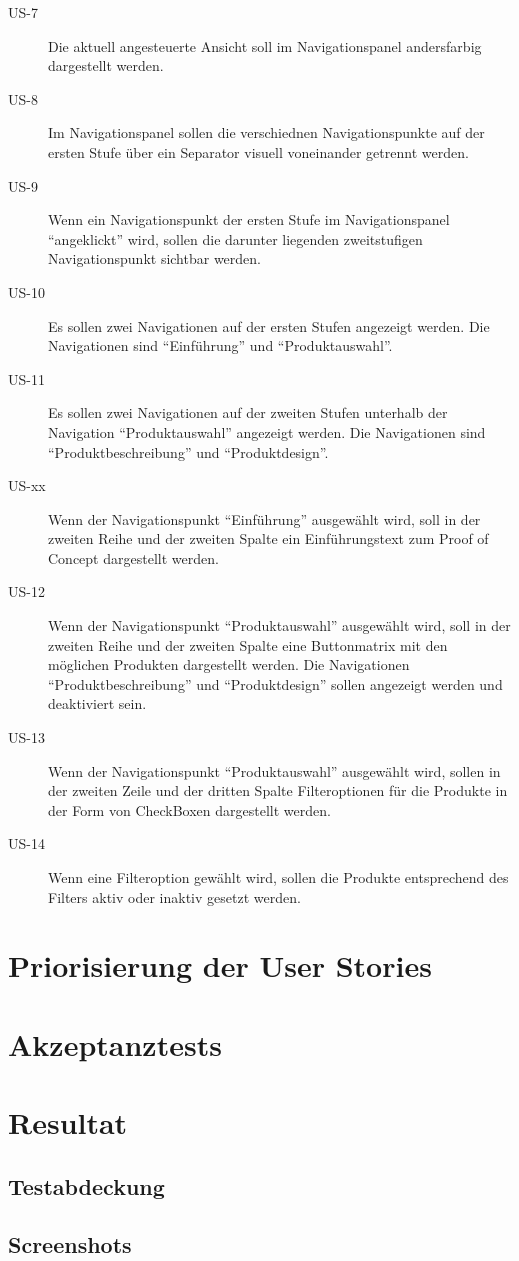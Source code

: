 \begin{description}
\item[US-7\label{itm:US-7}]
Die aktuell angesteuerte Ansicht soll im Navigationspanel andersfarbig
dargestellt werden.

\item[US-8\label{itm:US-8}]
Im Navigationspanel sollen die verschiednen Navigationspunkte auf der ersten
Stufe über ein Separator visuell voneinander getrennt werden.

\item[US-9\label{itm:US-9}]
Wenn ein Navigationspunkt der ersten Stufe im Navigationspanel ``angeklickt''
wird, sollen die darunter liegenden zweitstufigen Navigationspunkt sichtbar
werden.

\item[US-10\label{itm:US-10}]
Es sollen zwei Navigationen auf der ersten Stufen angezeigt werden. Die
Navigationen sind ``Einführung'' und ``Produktauswahl''.

\item[US-11\label{itm:US-11}]
Es sollen zwei Navigationen auf der zweiten Stufen unterhalb der Navigation
``Produktauswahl'' angezeigt werden. Die Navigationen sind
``Produktbeschreibung'' und ``Produktdesign''.

\item[US-xx]
Wenn der Navigationspunkt ``Einführung'' ausgewählt wird, soll in der zweiten
Reihe und der zweiten Spalte ein Einführungstext zum Proof of Concept
dargestellt werden.

\item[US-12]
Wenn der Navigationspunkt ``Produktauswahl'' ausgewählt wird, soll in der
zweiten Reihe und der zweiten Spalte eine Buttonmatrix mit den möglichen
Produkten dargestellt werden. Die Navigationen ``Produktbeschreibung'' und
``Produktdesign'' sollen angezeigt werden und deaktiviert sein.

\item[US-13]
Wenn der Navigationspunkt ``Produktauswahl'' ausgewählt wird, sollen in der
zweiten Zeile und der dritten Spalte Filteroptionen für die Produkte in der Form
von CheckBoxen dargestellt werden.

\item[US-14]
Wenn eine Filteroption gewählt wird, sollen die Produkte entsprechend des
Filters aktiv oder inaktiv gesetzt werden.

\end{description}

\section{Priorisierung der User Stories}

\section{Akzeptanztests}

\section{Resultat}

\subsection{Testabdeckung}

\subsection{Screenshots}